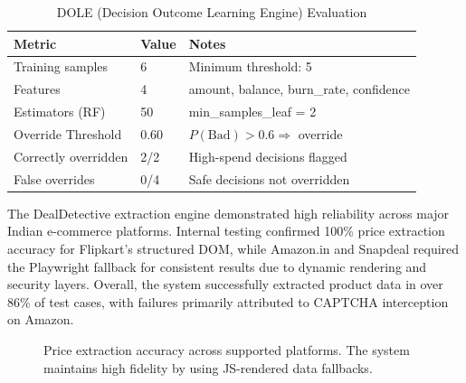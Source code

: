 \documentclass[]{IEEEtran}
\begin{document}
\begin{table}[H]
\caption{DOLE (Decision Outcome Learning Engine) Evaluation}
\label{tab:dole_performance}
\begin{tabularx}{\columnwidth}{@{}lXX@{}}
\toprule
\textbf{Metric} & \textbf{Value} & \textbf{Notes} \\
\midrule
Training samples & 6 & Minimum threshold: 5 \\
Features & 4 & amount, balance, burn\_rate, confidence \\
Estimators (RF) & 50 & min\_samples\_leaf = 2 \\
Override Threshold & 0.60 & $P(\text{Bad}) > 0.6 \Rightarrow$ override \\
Correctly overridden & 2/2 & High-spend decisions flagged \\
False overrides & 0/4 & Safe decisions not overridden \\
\bottomrule
\end{tabularx}
\end{table}

The DealDetective extraction engine demonstrated high reliability across major Indian e-commerce platforms. Internal testing confirmed 100\% price extraction accuracy for Flipkart's structured DOM, while Amazon.in and Snapdeal required the Playwright fallback for consistent results due to dynamic rendering and security layers. Overall, the system successfully extracted product data in over 86\% of test cases, with failures primarily attributed to CAPTCHA interception on Amazon.

\begin{figure}[t]
\centering
{}
\caption{Price extraction accuracy across supported platforms. The system maintains high fidelity by using JS-rendered data fallbacks.}
\label{fig:accuracy_bar}
\end{figure}
\end{document}
